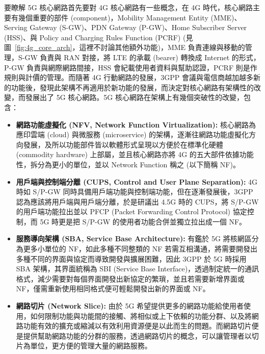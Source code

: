 要瞭解 5G 核心網路首先要對 4G 核心網路有一些概念，在 4G 時代，核心網路主要有幾個重要的部件 (component)，Mobility Management Entity (MME)、Serving Gateway (S-GW)、PDN Gateway (P-GW)、Home Subscriber Server (HSS)、與 Policy and Charging Rules Function (PCRF) (見圖~\ref{fig:4g_core_arch}，這裡不討論其他額外功能)，MME 負責連線與移動的管理，S-GW 負責與 RAN 對接，將 LTE 的承載 (bearer) 轉換成 Internet 的形式，P-GW 負責與網際網路間接，HSS 會紀載使用者資料與幫助認證，PCRF 則是作規則與計價的管理。而隨著 4G 行動網路的發展，3GPP 會議與電信商越加越多新的功能後，發現此架構不再適用於新功能的發展，而決定對核心網路有架構性的改變，而發展出了 5G 核心網路。5G 核心網路在架構上有幾個突破性的改變，包含：
\begin{itemize}
    \item \textbf{網路功能虛擬化 (NFV, Network Function Virtualization):} 核心網路為應印雲端 (cloud) 與微服務 (microservice) 的架構，逐漸往網路功能虛擬化方向發展，及所以功能部件皆以軟體形式呈現以方便於在標準化硬體 (commodity hardware) 上部屬，並且核心網路亦將 4G 的五大部件依據功能性，拆分為更小的單位，並以 Network Function 稱之 (以下簡稱 NF)。
    \item \textbf{用戶端與控制端分離 (CUPS, Control and User Plane Separation):} 4G 時如 S/P-GW 同時具備用戶端功能與控制端功能，但在逐漸發展後，3GPP 認為應該將用戶端與用戶端分離，於是研議出 4.5G 時的 CUPS，將 S/P-GW 的用戶端功能拉出並以 PFCP (Packet Forwarding Control Protocol) 協定控制，而 5G 時更是把 S/P-GW 的使用者功能合併並獨立拉出成一個 NF。
    \item \textbf{服務導向架構 (SBA, Service Base Architecture):} 有鑑於 5G 將核網區分為更多小單位的 NF，如此多種不同整類的 NF 若需互相溝通，將需要開發出多種不同的界面與協定而導致開發與擴展困難，因此 3GPP 於 5G 時採用 SBA 架構，其界面統稱為 SBI (Service Base Interface)，透過制定統一的通訊格式，減少需要對每個界面開發出新協定的繁瑣，並且若需要新增界面或 NF，僅需重新使用相同格式便可輕鬆開發出新的界面或 NF。
    \item \textbf{網路切片 (Network Slice):} 由於 5G 希望提供更多的網路功能給使用者使用，如何限制功能與功能間的接觸、將相似或上下依賴的功能分群、以及將網路功能有效的擴充或縮減以有效利用資源便是以此而生的問題。而網路切片便是提供幫助網路功能的分群的服務，透過網路切片的概念，可以讓管理者以切片為單位，更方便的管理大量的網路服務。
\end{itemize}

